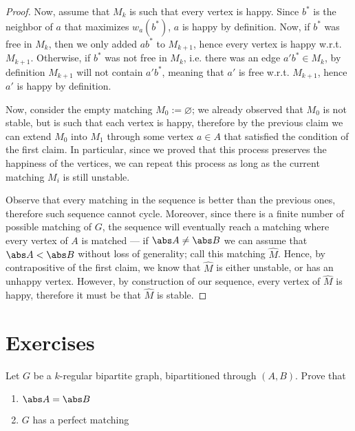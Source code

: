 \documentclass[a4paper, 12pt]{report}
\begin{document}
\begin{proof}
{            Now, assume that $M_k$ is such that every vertex is happy. Since $b^*$ is the neighbor of $a$ that maximizes $w_a(b^*)$, $a$ is happy by definition. Now, if $b^*$ was free in $M_k$, then we only added $ab^*$ to $M_{k + 1}$, hence every vertex is happy w.r.t. $M_{k + 1}$. Otherwise, if $b^*$ was not free in $M_k$, i.e. there was an edge $a'b^* \in M_k$, by definition $M_{k + 1}$ will not contain $a'b^*$, meaning that $a'$ is free w.r.t. $M_{k +1}$, hence $a'$ is happy by definition.
        }

        Now, consider the empty matching $M_0 := \varnothing$; we already observed that $M_0$ is not stable, but is such that each vertex is happy, therefore by the previous claim we can extend $M_0$ into $M_1$ through some vertex $a \in A$ that satisfied the condition of the first claim. In particular, since we proved that this process preserves the happiness of the vertices, we can repeat this process as long as the current matching $M_i$ is still unstable.

        Observe that every matching in the sequence is better than the previous ones, therefore such sequence cannot cycle. Moreover, since there is a finite number of possible matching of $G$, the sequence will eventually reach a matching where every vertex of $A$ is matched --- if $\abs A \neq \abs B$ we can assume that $\abs A < \abs B$ without loss of generality; call this matching $\hat M$. Hence, by contrapositive of the first claim, we know that $\hat M$ is either unstable, or has an unhappy vertex. However, by construction of our sequence, every vertex of $\hat M$ is happy, therefore it must be that $\hat M$ is stable.
    \end{proof}

    \section{Exercises}

    \begin{framedprob}{}
        Let $G$ be a $k$-regular bipartite graph, bipartitioned through $(A, B)$. Prove that

        \begin{enumerate}
            \item $\abs A = \abs B$
            \item $G$ has a perfect matching
        \end{enumerate}
    \end{framedprob}
\end{document}
